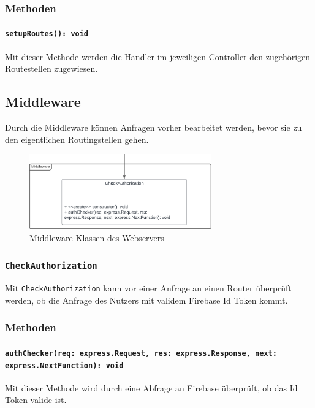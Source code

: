 \documentclass{entwurfsheft}
\begin{document}
\subsubsection*{Methoden}
\paragraph{\texttt{setupRoutes(): void}}
Mit dieser Methode werden die Handler im jeweiligen Controller den zugehörigen Routestellen zugewiesen.

\newpage

\subsection{Middleware}
Durch die Middleware können Anfragen vorher bearbeitet werden, bevor sie zu den eigentlichen Routingstellen gehen.

\begin{figure}[htp]
    \centering
    \includegraphics[width = 0.7\textwidth]{images/webserver/middleware.pdf}
    \caption{Middleware-Klassen des Webservers}
    \label{fig:middleware}
\end{figure}

\subsubsection{\texttt{CheckAuthorization}}\label{sec:CheckAuthorization}
Mit \texttt{CheckAuthorization} kann vor einer Anfrage an einen Router überprüft werden, ob die Anfrage des Nutzers mit validem Firebase Id Token kommt. %
\subsubsection*{Methoden}
\paragraph{\texttt{authChecker(req: express.Request, res: express.Response, next: express.NextFunction): void}}
Mit dieser Methode wird durch eine Abfrage an Firebase überprüft, ob das Id Token valide ist.
\end{document}
